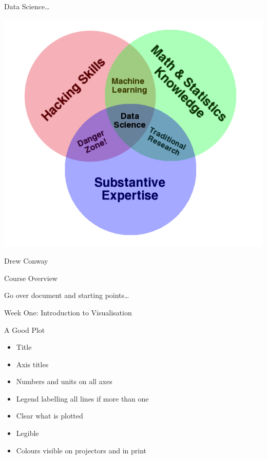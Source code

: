 \documentclass{beamer}
\begin{document}
\begin{frame}{Data Science\ldots}

\begin{center}
\includegraphics[scale=0.35]{pics/DS_venn_drew_conway.png}
\end{center}

Drew Conway

\end{frame}



\begin{frame}{Course Overview}

Go over document and starting points\ldots

\end{frame}



\begin{frame}{Week One: Introduction to Visualisation}

\end{frame}


\begin{frame}{A Good Plot}

\begin{itemize}
\item Title
\item Axis titles
\item Numbers and units on all axes
\item Legend labelling all lines if more than one
\item Clear what is plotted
\item Legible
\item Colours visible on projectors and in print
\end{itemize}

\end{frame}
\end{document}

